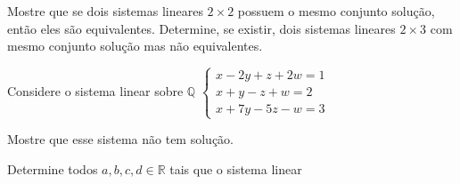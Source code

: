 \begin{questions}
\begin{solutionordottedlines}
  \end{solutionordottedlines}

  \question\label{exercício:5}

  Mostre que se dois sistemas lineares $2\times2$ possuem o mesmo
  conjunto solução, então eles são equivalentes.
  Determine, se existir, dois sistemas lineares $2\times3$ com mesmo
  conjunto solução mas não equivalentes.

  \begin{solutionordottedlines}
  \end{solutionordottedlines}

  \question\label{exercício:6}

  Considere o sistema linear sobre $\mathbb{Q}$
  \begin{math}
    \begin{cases}
      x-2 y+z+2 w=1 \\
      x+y-z+w=2     \\
      x+7 y-5 z-w=3
    \end{cases}
  \end{math}

  Mostre que esse sistema não tem solução.

  \begin{solutionordottedlines}
  \end{solutionordottedlines}

  \question\label{exercício:7}

  Determine todos $a,b,c,d\in\mathbb{R}$ tais que o sistema linear


\end{questions}

